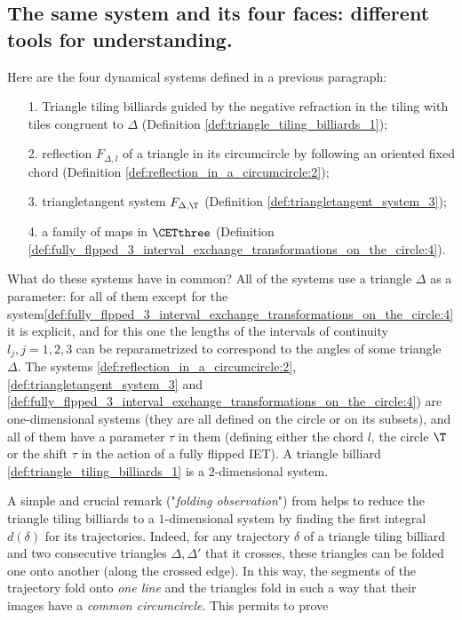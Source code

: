 \documentclass[12pt]{article}
\theoremstyle{definition}
\begin{document}
\subsection{The same system and its four faces: different tools for understanding.}\label{subs:connections}
Here are the four dynamical systems defined in a previous paragraph: 
\begin{itemize}
\item[1.] Triangle tiling billiards guided by the negative refraction in the tiling with tiles congruent to $\Delta$ (Definition \ref{def:triangle_tiling_billiards_1});
\item[2.] reflection $F_{\Delta, l}$ of a triangle in its circumcircle by following an oriented fixed chord (Definition \ref{def:reflection_in_a_circumcircle:2});
\item[3.] triangletangent system $F_{\Delta, \T}$ (Definition \ref{def:triangletangent_system_3});
\item[4.] a family of maps in $\CETthree$ (Definition \ref{def:fully_flpped_3_interval_exchange_transformations_on_the_circle:4}).
\end{itemize}
What do these systems have in common? All of the systems use a triangle $\Delta$ as a parameter: for all of them except for the system\ref{def:fully_flpped_3_interval_exchange_transformations_on_the_circle:4} it is explicit, and for this one the lengths of the intervals of continuity $l_j, j=1,2,3$ can be reparametrized to correspond to the angles of some triangle $\Delta$. The systems \ref{def:reflection_in_a_circumcircle:2}, \ref{def:triangletangent_system_3} and \ref{def:fully_flpped_3_interval_exchange_transformations_on_the_circle:4}) are one-dimensional systems (they are all defined on the circle or on its subsets), and all of them have a parameter $\tau$ in them (defining either the chord $l$, the circle $\T$ or the shift $\tau$ in the action of a fully flipped IET). A triangle billiard \ref{def:triangle_tiling_billiards_1} is a $2$-dimensional system. 

\smallskip

A simple and crucial remark ("\emph{folding observation}") from \cite{BDFI18} helps to reduce the triangle tiling billiards to a $1$-dimensional system by finding the first integral $d(\delta)$ for its trajectories. Indeed, for any trajectory $\delta$ of a triangle tiling billiard and two consecutive triangles $\Delta, \Delta'$ that it crosses, these triangles can be folded one onto another (along the crossed edge). In this way, the segments of the trajectory fold onto \emph{one line }and the triangles fold in such a way that their images have a \emph{common circumcircle}. This permits to prove
\end{document}
